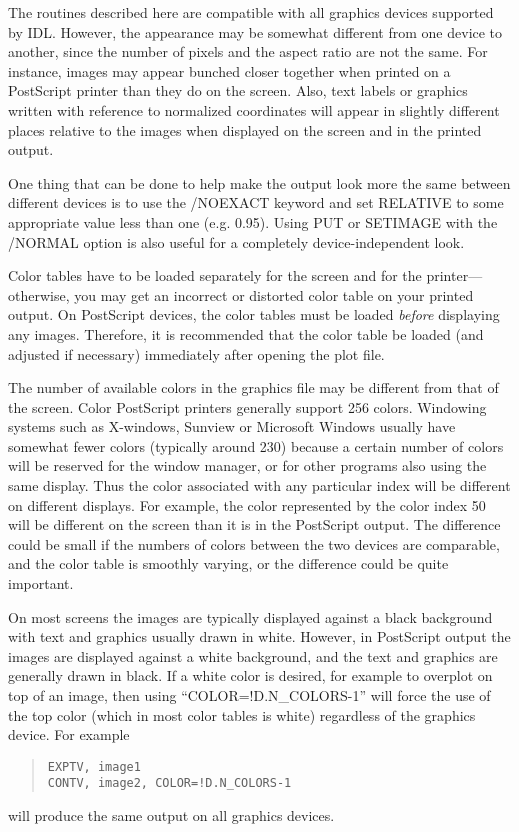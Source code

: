 The routines described here are compatible with all graphics devices supported
by IDL.  However, the appearance may be somewhat different from one device to
another, since the number of pixels and the aspect ratio are not the same.  For
instance, images may appear bunched closer together when printed on a
PostScript printer than they do on the screen.  Also, text labels or graphics
written with reference to normalized coordinates will appear in slightly
different places relative to the images when displayed on the screen and in the
printed output.

One thing that can be done to help make the output look more the same between
different devices is to use the /NOEXACT keyword and set RELATIVE to some
appropriate value less than one (e.g.  0.95).  Using PUT or SETIMAGE with the
/NORMAL option is also useful for a completely device-independent look.

Color tables have to be loaded separately for the screen and for the
printer---otherwise, you may get an incorrect or distorted color table on your
printed output.  On PostScript devices, the color tables must be loaded {\em
before}\/ displaying any images.  Therefore, it is recommended that the color
table be loaded (and adjusted if necessary) immediately after opening the plot
file.

The number of available colors in the graphics file may be different from that
of the screen.  Color PostScript printers generally support 256 colors.
Windowing systems such as X-windows, Sunview or Microsoft Windows usually have
somewhat fewer colors (typically around 230) because a certain number of colors
will be reserved for the window manager, or for other programs also using the
same display.  Thus the color associated with any particular index will be
different on different displays.  For example, the color represented by the
color index 50 will be different on the screen than it is in the PostScript
output.  The difference could be small if the numbers of colors between the two
devices are comparable, and the color table is smoothly varying, or the
difference could be quite important.

On most screens the images are typically displayed against a black background
with text and graphics usually drawn in white.  However, in PostScript output
the images are displayed against a white background, and the text and graphics
are generally drawn in black.  If a white color is desired, for example to
overplot on top of an image, then using ``COLOR=!D.N\_COLORS-1'' will force the
use of the top color (which in most color tables is white) regardless of the
graphics device.  For example
\begin{quote}
\begin{verbatim}
EXPTV, image1
CONTV, image2, COLOR=!D.N_COLORS-1
\end{verbatim}
\end{quote}
will produce the same output on all graphics devices.


